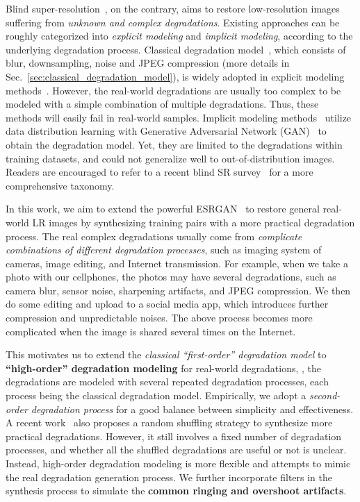 \documentclass[10pt,twocolumn,letterpaper]{article}
\begin{document}
Blind super-resolution~\cite{michaeli2013nonparametric,bell2019blind,zhang2018learning}, on the contrary, aims to restore low-resolution images suffering from \textit{unknown and complex degradations}. Existing approaches can be roughly categorized into \textit{explicit modeling} and \textit{implicit modeling}, according to the underlying degradation process. 
Classical degradation model~\cite{elad1997restoration,liu2013bayesian}, which consists of blur, downsampling, noise and JPEG compression (more details in Sec.~\ref{sec:classical_degradation_model}), is widely adopted in explicit modeling methods~\cite{zhang2018learning,gu2019blind,luo2020unfolding}. 
However, the real-world degradations are usually too complex to be modeled with a simple combination of multiple degradations. Thus, these methods will easily fail in real-world samples.
Implicit modeling methods~\cite{yuan2018unsupervised,FritscheGT19,wang2021unsupervised} utilize data distribution learning with Generative Adversarial Network (GAN)~\cite{goodfellow2014generative} to obtain the degradation model. Yet, they are limited to the degradations within training datasets, and could not generalize well to out-of-distribution images. 
Readers are encouraged to refer to a recent blind SR survey~\cite{liu2021blindsurvey} for a more comprehensive taxonomy.

In this work, we aim to extend the powerful ESRGAN~\cite{wang2018esrgan} to restore general real-world LR images by synthesizing training pairs with a more practical degradation process.
The real complex degradations usually come from \textit{complicate combinations of different degradation processes}, such as imaging system of cameras, image editing, and Internet transmission.
For example, when we take a photo with our cellphones, the photos may have several degradations, such as camera blur, sensor noise, sharpening artifacts, and JPEG compression. 
We then do some editing and upload to a social media app, which introduces further compression and unpredictable noises.
The above process becomes more complicated when the image is shared several times on the Internet. 

This motivates us to extend the \textit{classical ``first-order'' degradation model} to \textbf{``high-order'' degradation modeling} for real-world degradations, \ie, the degradations are modeled with several repeated degradation processes, each process being the classical degradation model.
Empirically, we adopt a \textit{second-order degradation process} for a good balance between simplicity and effectiveness.
A recent work~\cite{zhang2021designing} also proposes a random shuffling strategy to synthesize more practical degradations. However, it still involves a fixed number of degradation processes, and whether all the shuffled degradations are useful or not is unclear.
Instead, high-order degradation modeling is more flexible and attempts to mimic the real degradation generation process.
We further incorporate  filters in the synthesis process to simulate the \textbf{common ringing and overshoot artifacts}.
\end{document}
